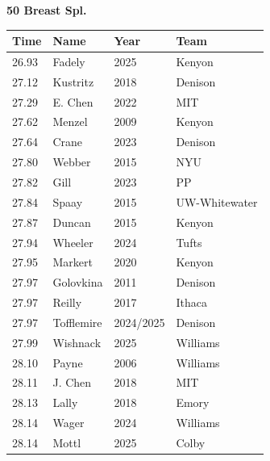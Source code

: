 \noindent\begin{minipage}[t]{0.98\textwidth}
\centering
\textbf{\textcolor{teamprimary}{50 Breast Spl.}}\par
\vspace{0.5em}
\centering
\small
\renewcommand{\arraystretch}{1.0}
\setlength{\tabcolsep}{4pt}
\begin{tabular}{@{}p{2.5cm}p{4.5cm}p{1.5cm}p{2.5cm}@{}}
\toprule
\textbf{Time} & \textbf{Name} & \textbf{Year} & \textbf{Team} \\
\midrule
26.93 & Fadely & 2025 & Kenyon \\
27.12 & Kustritz & 2018 & Denison \\
27.29 & E. Chen & 2022 & MIT \\
27.62 & Menzel & 2009 & Kenyon \\
27.64 & Crane & 2023 & Denison \\
27.80 & Webber & 2015 & NYU \\
27.82 & Gill & 2023 & PP \\
27.84 & Spaay & 2015 & UW-Whitewater \\
27.87 & Duncan & 2015 & Kenyon \\
27.94 & Wheeler & 2024 & Tufts \\
27.95 & Markert & 2020 & Kenyon \\
27.97 & Golovkina & 2011 & Denison \\
27.97 & Reilly & 2017 & Ithaca \\
27.97 & Tofflemire & 2024/2025 & Denison \\
27.99 & Wishnack & 2025 & Williams \\
28.10 & Payne & 2006 & Williams \\
28.11 & J. Chen & 2018 & MIT \\
28.13 & Lally & 2018 & Emory \\
28.14 & Wager & 2024 & Williams \\
28.14 & Mottl & 2025 & Colby \\
\bottomrule
\end{tabular}
\end{minipage}
\vspace{1.2em}
